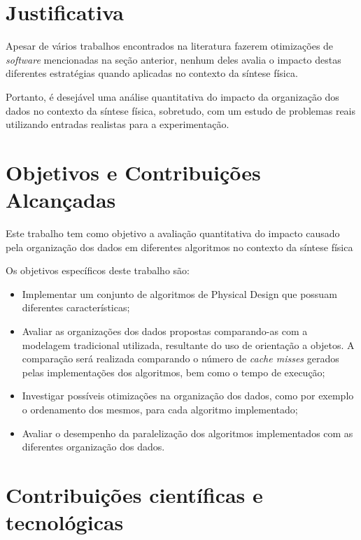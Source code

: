 \section{Justificativa}

    Apesar de vários trabalhos encontrados na literatura fazerem otimizações de \textit{software} mencionadas na seção anterior, nenhum deles avalia o impacto destas diferentes estratégias quando aplicadas no contexto da síntese física.

    Portanto, é desejável uma análise quantitativa do impacto da organização dos dados no contexto da síntese física, sobretudo, com um estudo de problemas reais utilizando entradas realistas para a experimentação.

\section{Objetivos e Contribuições Alcançadas}

    Este trabalho tem como objetivo a avaliação quantitativa do impacto causado pela organização dos dados em diferentes algoritmos no contexto da síntese física

    Os objetivos específicos deste trabalho são:

    \begin{itemize}
        \item Implementar um conjunto de algoritmos de Physical Design que possuam diferentes características;
        \item Avaliar as organizações dos dados propostas comparando-as com a modelagem tradicional utilizada, resultante do uso de orientação a objetos. A comparação será realizada comparando o número de \textit{cache misses} gerados pelas implementações dos algoritmos, bem como o tempo de execução;
        \item Investigar possíveis otimizações na organização dos dados, como por exemplo o ordenamento dos mesmos, para cada algoritmo implementado;
        \item Avaliar o desempenho da paralelização dos algoritmos implementados com as diferentes organização dos dados.
    \end{itemize}

\section{Contribuições científicas e tecnológicas}

